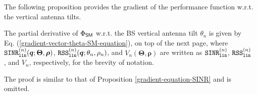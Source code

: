 The following proposition provides the gradient of the performance function w.r.t. the vertical antenna tilts.
\begin{Proposition}\label{gradient-vector-theta-SM}
    The partial derivative of $\Phi_{{\sf SM}}$ w.r.t. the BS vertical antenna tilt $\theta_n$ is given by Eq. (\ref{gradient-vector-theta-SM-equation}), on top of the next page,
where $\mathtt{SINR}^{(n)}_{\mathtt{lin}}(\bm{q}; \bm{\Theta}, \bm{\rho})$, $\mathtt{RSS}^{(n)}_{\mathtt{lin}}(\bm{q}; \theta_n, \rho_n)$, and $V_n(\bm{\Theta}, \bm{\rho})$ are written as $\mathtt{SINR}^{(n)}_{\mathtt{lin}} $, $\mathtt{RSS}^{(n)}_{\mathtt{lin}}$, and $V_n$, respectively, for the brevity of notation.
\end{Proposition}
\noindent The proof is similar to that of Proposition \ref{gradient-equation-SINR} and is omitted.



